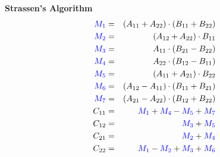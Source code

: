 \documentclass[MS]{wfuthesis}
\begin{document}
                    \newpage
                    \begin{multicols}{2}
                        \textbf{Strassen's Algorithm}
                            \begin{eqnarray*}
                                \color{blue} M_1 & = & (A_{11} + A_{22})\cdot (B_{11} + B_{22}) \\
                                \color{blue} M_2 & = & (A_{12} + A_{22})\cdot B_{11} \\
                                \color{blue} M_3 & = & A_{11}\cdot (B_{21} - B_{22}) \\
                                \color{blue} M_4 & = & A_{22}\cdot (B_{12} - B_{11}) \\
                                \color{blue} M_5 & = & (A_{11} + A_{21})\cdot B_{22} \\
                                \color{blue} M_6 & = & (A_{12} - A_{11})\cdot (B_{11} + B_{21}) \\
                                \color{blue} M_7 & = & (A_{21} - A_{22})\cdot (B_{12} + B_{22}) \\
                                C_{11} & = & \color{blue} M_1 \color{black} + \color{blue} M_4 \color{black} - \color{blue} M_5 \color{black} + \color{blue} M_7 \\
                                C_{12} & = & \color{blue} M_3 \color{black} + \color{blue} M_5 \\
                                C_{21} & = & \color{blue} M_2 \color{black} + \color{blue} M_4 \\
                                C_{22} & = & \color{blue} M_1 \color{black} - \color{blue} M_2 \color{black} + \color{blue} M_3 \color{black} + \color{blue} M_6
                            \end{eqnarray*}
                            
                        \columnbreak


\end{multicols}
\end{document}
